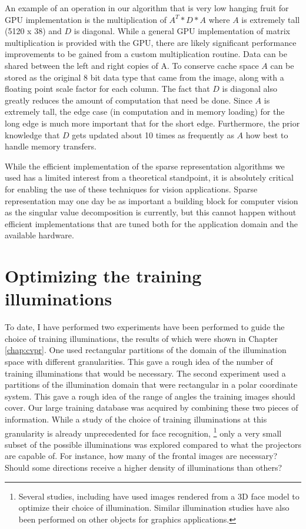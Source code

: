 An example of an operation in our algorithm that is very low hanging fruit for GPU implementation is the multiplication of $A^T * D * A$ where $A$ is extremely tall (5120 x 38) and $D$ is diagonal.  While a general GPU implementation of matrix multiplication is provided with the GPU, there are likely significant performance improvements to be gained from a custom multiplication routine.  Data can be shared between the left and right copies of A.  To conserve cache space $A$ can be stored as the original 8 bit data type that came from the image, along with a floating point scale factor for each column.  The fact that $D$ is diagonal also greatly reduces the amount of computation that need be done.  Since $A$ is extremely tall, the edge case (in computation and in memory loading) for  the long edge is much more important that for the short edge.  Furthermore, the prior knowledge that $D$ gets updated about 10 times as frequently as $A$ how best to handle memory transfers.

While the efficient implementation of the sparse representation algorithms we used has a limited interest from a theoretical standpoint, it is absolutely critical for enabling the use of these techniques for vision applications.  Sparse representation may one day be as important a building block for computer vision as the singular value decomposition is currently, but this cannot happen without efficient implementations that are tuned both for the application domain and the available hardware.  

\section{Optimizing the training illuminations}
To date, I have performed two experiments have been performed to guide the choice of training illuminations, the results of which were shown in Chapter \ref{chap:cvpr}.  One used rectangular partitions of the domain of the illumination space with different granularities.  This gave a rough idea of the number of training illuminations that would be necessary.  The second experiment used a partitions of the illumination domain that were rectangular in a polar coordinate system.  This gave a rough idea of the range of angles the training images should cover.  Our large training database was acquired by combining these two pieces of information.  While a study of the choice of training illuminations at this granularity is already unprecedented for face recognition, \footnote{ Several studies, including \cite{Basri2003-PAMI, LeeK2005-PAMI} have used images rendered from a 3D face model to optimize their choice of illumination.  Similar illumination studies have also been performed on other objects for graphics applications.} only a very small subset of the possible illuminations was explored compared to what the projectors are capable of.  For instance, how many of the frontal images are necessary?  Should some directions receive a higher density of illuminations than others? 

